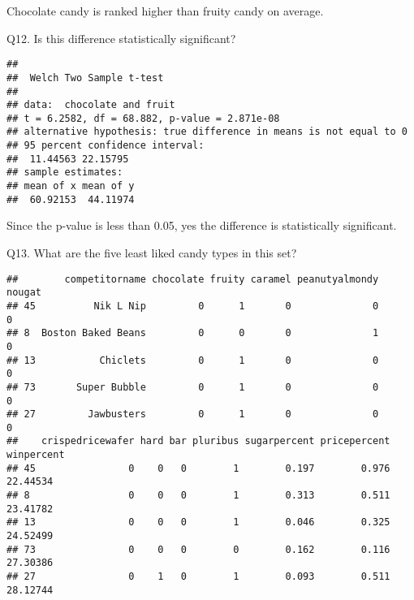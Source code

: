 \documentclass[
]{article}
\newenvironment{Shaded}{\begin{snugshade}}{\end{snugshade}}
\newcommand{\AttributeTok}[1]{\textcolor[rgb]{0.13,0.29,0.53}{#1}}
\newcommand{\DecValTok}[1]{\textcolor[rgb]{0.00,0.00,0.81}{#1}}
\newcommand{\FunctionTok}[1]{\textcolor[rgb]{0.13,0.29,0.53}{\textbf{#1}}}
\newcommand{\NormalTok}[1]{#1}
\newcommand{\OtherTok}[1]{\textcolor[rgb]{0.56,0.35,0.01}{#1}}
\newcommand{\SpecialCharTok}[1]{\textcolor[rgb]{0.81,0.36,0.00}{\textbf{#1}}}
\begin{document}
Chocolate candy is ranked higher than fruity candy on average.

Q12. Is this difference statistically significant?

\begin{Shaded}
\end{Shaded}

\begin{verbatim}
## 
##  Welch Two Sample t-test
## 
## data:  chocolate and fruit
## t = 6.2582, df = 68.882, p-value = 2.871e-08
## alternative hypothesis: true difference in means is not equal to 0
## 95 percent confidence interval:
##  11.44563 22.15795
## sample estimates:
## mean of x mean of y 
##  60.92153  44.11974
\end{verbatim}

Since the p-value is less than 0.05, yes the difference is statistically
significant.

Q13. What are the five least liked candy types in this set?

\begin{Shaded}
\end{Shaded}

\begin{verbatim}
##        competitorname chocolate fruity caramel peanutyalmondy nougat
## 45          Nik L Nip         0      1       0              0      0
## 8  Boston Baked Beans         0      0       0              1      0
## 13           Chiclets         0      1       0              0      0
## 73       Super Bubble         0      1       0              0      0
## 27         Jawbusters         0      1       0              0      0
##    crispedricewafer hard bar pluribus sugarpercent pricepercent winpercent
## 45                0    0   0        1        0.197        0.976   22.44534
## 8                 0    0   0        1        0.313        0.511   23.41782
## 13                0    0   0        1        0.046        0.325   24.52499
## 73                0    0   0        0        0.162        0.116   27.30386
## 27                0    1   0        1        0.093        0.511   28.12744
\end{verbatim}
\end{document}
